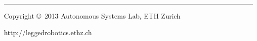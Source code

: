 \documentclass[10pt,landscape,a4paper]{article}
\makeatletter
\renewcommand{\subsubsection}{\@startsection{subsubsection}{3}{0mm}%
                                {-1ex plus -.5ex minus -.2ex}%
                                {1ex plus .2ex}%
                                {\normalfont\small\bfseries}}
\makeatother
\begin{document}
\begin{multicols}{2}
\begin{tabular}{@{}ll@{}}
\end{tabular}





\rule{0.3\linewidth}{0.25pt}
\scriptsize

Copyright \copyright\ 2013 Autonomous Systems Lab, ETH Zurich

http://leggedrobotics.ethz.ch


\end{multicols}
\end{document}
